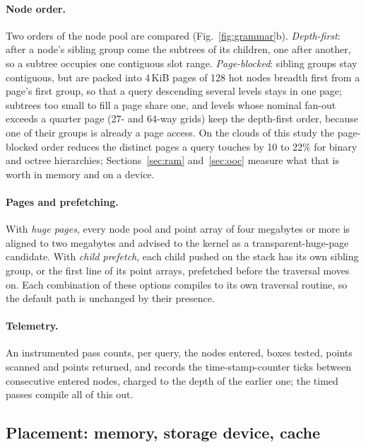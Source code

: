 \paragraph{Node order.} Two orders of the node pool are compared (Fig.~\ref{fig:grammar}b). \emph{Depth-first}: after a node's sibling group come the subtrees of its children, one after another, so a subtree occupies one contiguous slot range. \emph{Page-blocked}: sibling groups stay contiguous, but are packed into 4\,KiB pages of 128 hot nodes breadth first from a page's first group, so that a query descending several levels stays in one page; subtrees too small to fill a page share one, and levels whose nominal fan-out exceeds a quarter page (27- and 64-way grids) keep the depth-first order, because one of their groups is already a page access. On the clouds of this study the page-blocked order reduces the distinct pages a query touches by 10 to 22\% for binary and octree hierarchies; Sections~\ref{sec:ram} and~\ref{sec:ooc} measure what that is worth in memory and on a device.

\paragraph{Pages and prefetching.} With \emph{huge pages}, every node pool and point array of four megabytes or more is aligned to two megabytes and advised to the kernel as a transparent-huge-page candidate. With \emph{child prefetch}, each child pushed on the stack has its own sibling group, or the first line of its point arrays, prefetched before the traversal moves on. Each combination of these options compiles to its own traversal routine, so the default path is unchanged by their presence.

\paragraph{Telemetry.} An instrumented pass counts, per query, the nodes entered, boxes tested, points scanned and points returned, and records the time-stamp-counter ticks between consecutive entered nodes, charged to the depth of the earlier one; the timed passes compile all of this out.

\subsection{Placement: memory, storage device, cache}\label{sec:placement}

